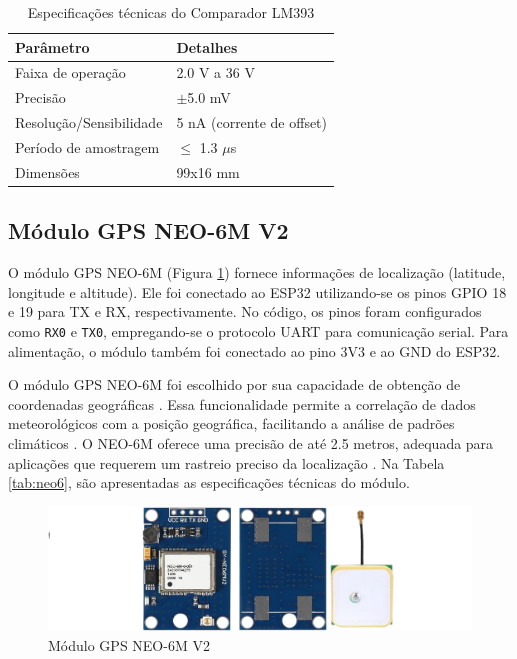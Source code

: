 \begin{table}[!htb]
  \caption{Especificações técnicas do Comparador LM393}
  \begin{tabularx}{\textwidth}{|X|X|} \hline
      \textbf{Parâmetro} & \textbf{Detalhes} \\ \hline
      Faixa de operação & 2.0 V a 36 V \\ \hline
      Precisão & $\pm$5.0 mV \\ \hline
      Resolução/Sensibilidade & 5 nA (corrente de offset) \\ \hline
      Período de amostragem & $\leq$ 1.3 $\mu$s \\ \hline
      Dimensões & 99x16 mm \\ \hline
  \end{tabularx}
  \label{tab:lm393}
\end{table}

\subsection{Módulo GPS NEO-6M V2}

O módulo GPS NEO-6M (Figura \ref{figura:neo6m}) fornece informações de localização (latitude, longitude e altitude). Ele foi conectado ao ESP32 utilizando-se os pinos GPIO 18 e 19 para TX e RX, respectivamente. No código, os pinos foram configurados como \texttt{RX0} e \texttt{TX0}, empregando-se o protocolo UART para comunicação serial. Para alimentação, o módulo também foi conectado ao pino 3V3 e ao GND do ESP32.

O módulo GPS NEO-6M foi escolhido por sua capacidade de obtenção de coordenadas geográficas \parencite{NEO6M}. Essa funcionalidade permite a correlação de dados meteorológicos com a posição geográfica, facilitando a análise de padrões climáticos \parencite{Zhang_evapotranspiration_med2016}. O NEO-6M oferece uma precisão de até 2.5 metros, adequada para aplicações que requerem um rastreio preciso da localização \parencite{NEO6M}. Na Tabela \ref{tab:neo6}, são apresentadas as especificações técnicas do módulo.

\begin{figure}[!htb] \centering
  \caption{Módulo GPS NEO-6M V2} \label{figura:neo6m}
  \begin{varwidth}{\linewidth}
    \includegraphics[width=16cm]{figuras/NEO6MV2.png}
  \end{varwidth}
\end{figure}

